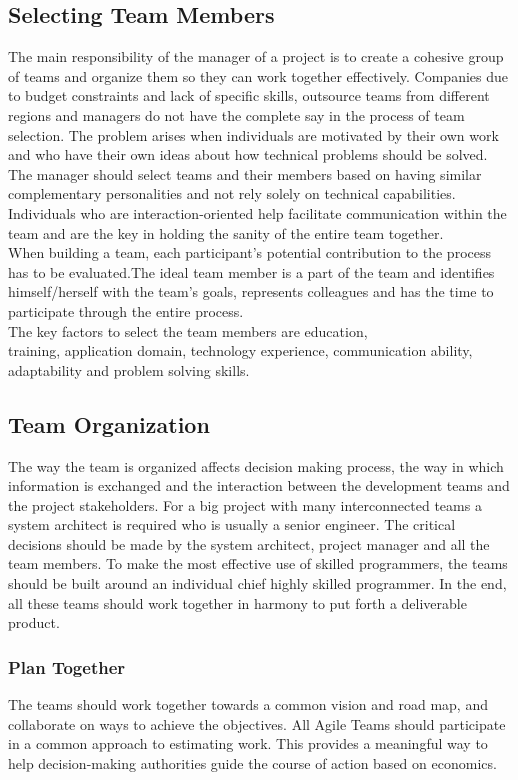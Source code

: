 \documentclass[sigplan,screen]{acmart}
\begin{document}
\subsection{Selecting Team Members}
The main responsibility of the manager of a project is to create a cohesive group of teams and organize them so they can work together effectively. Companies due to budget constraints and lack of specific skills, outsource teams from different regions and managers do not have the complete say in the process of team selection. The problem arises when individuals are motivated by their own work and who have their own ideas about how technical problems should be solved. The manager should select teams and their members based on having similar complementary personalities and not rely solely on technical capabilities. Individuals who are interaction-oriented help facilitate communication within the team and are the key in holding the sanity of the entire team together\cite{ian}. \\
When building a team, each participant's potential contribution to the process has to be evaluated.The ideal team member is a part of the team and identifies himself/herself with the team's goals, represents colleagues and has the time to participate through the entire process\cite{Gautam}.\\
The key factors to select the team members are education,\\
training, application domain, technology experience, communication ability, adaptability and problem solving skills\cite{ian}.
\subsection{Team Organization}
The way the team is organized affects decision making process, the way in which information is exchanged and the interaction between the development teams and the project stakeholders. For a big project with many interconnected teams a system architect is required who is usually a senior engineer. The critical decisions should be made by the system architect, project manager and all the team members. To make the most effective use of skilled programmers, the teams should be built around an individual chief highly skilled programmer. In the end, all these teams should work together in harmony to put forth a deliverable product. 
\subsubsection{Plan Together}
The teams should work together towards a common vision and road map, and  collaborate on ways to achieve the objectives. All Agile Teams should participate in a common approach to estimating work. This provides a meaningful way to help decision-making authorities guide the course of action based on economics.
\end{document}
